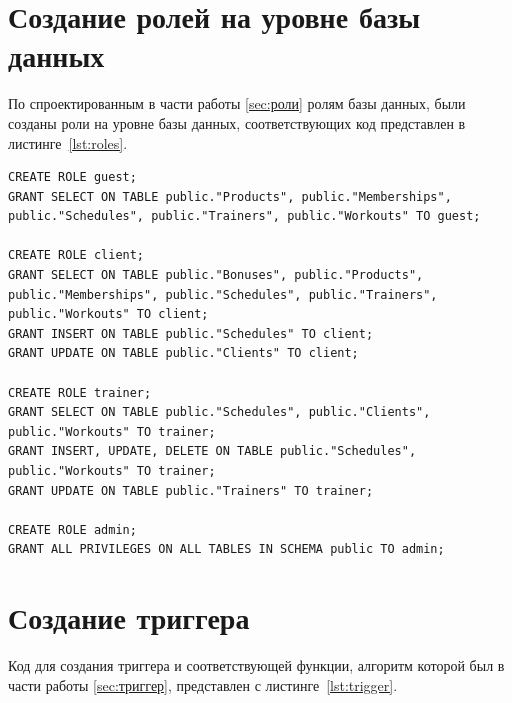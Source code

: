 \section{Создание ролей на уровне базы данных}

По спроектированным в части работы \ref{sec:роли} ролям базы данных, были созданы роли на уровне базы данных, соответствующих код представлен в листинге~\ref{lst:roles}.

\begin{center}
	\captionsetup{justification=raggedright,singlelinecheck=off}
	\begin{lstlisting}[label=lst:roles,caption={Код на SQL для создания ролей}]
CREATE ROLE guest;
GRANT SELECT ON TABLE public."Products", public."Memberships", public."Schedules", public."Trainers", public."Workouts" TO guest;

CREATE ROLE client;
GRANT SELECT ON TABLE public."Bonuses", public."Products", public."Memberships", public."Schedules", public."Trainers", public."Workouts" TO client;
GRANT INSERT ON TABLE public."Schedules" TO client;
GRANT UPDATE ON TABLE public."Clients" TO client;

CREATE ROLE trainer;
GRANT SELECT ON TABLE public."Schedules", public."Clients", public."Workouts" TO trainer;
GRANT INSERT, UPDATE, DELETE ON TABLE public."Schedules", public."Workouts" TO trainer;
GRANT UPDATE ON TABLE public."Trainers" TO trainer;

CREATE ROLE admin;
GRANT ALL PRIVILEGES ON ALL TABLES IN SCHEMA public TO admin;
	\end{lstlisting}
\end{center}

\section{Создание триггера}

Код для создания триггера и соответствующей функции, алгоритм которой был в части работы \ref{sec:триггер}, представлен с листинге~\ref{lst:trigger}.

